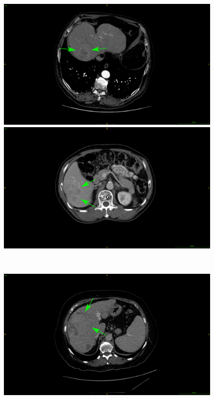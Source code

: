 {\begin{figure}[!ht]
\begin{mdframed}[backgroundcolor=blue!50,linecolor=blue!50]
\begin{minipage}{0.45\linewidth}
		\end{minipage} \\
		\begin{minipage}{0.45\linewidth}
			\includegraphics[width=\linewidth]{images/ImagingTraits/GDB_nonSmoothMargins}
		\end{minipage} \hspace{-0.1cm}
		\begin{minipage}{0.45\linewidth}
			\includegraphics[width=\linewidth]{images/ImagingTraits/TCIA_nonSmoothMargins}
		\end{minipage} \\
		\begin{minipage}{0.45\linewidth}
			\includegraphics[width=\linewidth]{images/ImagingTraits/GDB_halo}

\end{minipage}
\end{mdframed}
\end{figure}}
